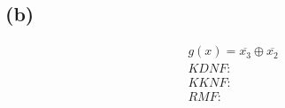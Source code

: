 \documentclass[12pt]{article}
\begin{document}
\subsection{(b)}
\begin{align}
& g(x) = \overline {x_3} \oplus \overline {x_2}\\
& KDNF: \\
& KKNF:\\
& RMF:
\end{align}
\end{document}

